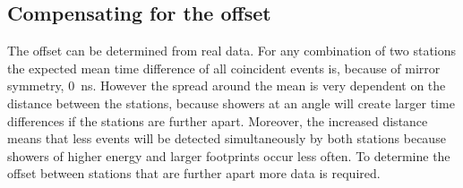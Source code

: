 \subsection{Compensating for the offset}

The offset can be determined from real data. For any combination of two stations the expected mean time difference of all coincident events is, because of mirror symmetry, \SI{0}{\ns}. However the spread around the mean is very dependent on the distance between the stations, because showers at an angle will create larger time differences if the stations are further apart. Moreover, the increased distance means that less events will be detected simultaneously by both stations because showers of higher energy and larger footprints occur less often. To determine the offset between stations that are further apart more data is required.

